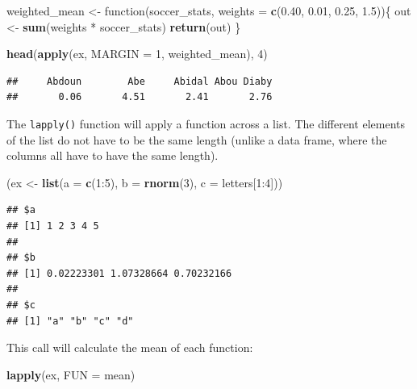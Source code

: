 \documentclass[]{book}
\makeatletter
\newenvironment{Shaded}{\begin{snugshade}}{\end{snugshade}}
\newcommand{\KeywordTok}[1]{\textcolor[rgb]{0.13,0.29,0.53}{\textbf{{#1}}}}
\newcommand{\DataTypeTok}[1]{\textcolor[rgb]{0.13,0.29,0.53}{{#1}}}
\newcommand{\DecValTok}[1]{\textcolor[rgb]{0.00,0.00,0.81}{{#1}}}
\newcommand{\FloatTok}[1]{\textcolor[rgb]{0.00,0.00,0.81}{{#1}}}
\newcommand{\StringTok}[1]{\textcolor[rgb]{0.31,0.60,0.02}{{#1}}}
\newcommand{\NormalTok}[1]{{#1}}
\newenvironment{kframe}{%
\medskip{}
\setlength{\fboxsep}{.8em}
 \def\at@end@of@kframe{}%
 \ifinner\ifhmode%
  \def\at@end@of@kframe{\end{minipage}}%
  \begin{minipage}{\columnwidth}%
 \fi\fi%
 \def\FrameCommand##1{\hskip\@totalleftmargin \hskip-\fboxsep
 \colorbox{shadecolor}{##1}\hskip-\fboxsep
     \hskip-\linewidth \hskip-\@totalleftmargin \hskip\columnwidth}%
 \MakeFramed {\advance\hsize-\width
   \@totalleftmargin\z@ \linewidth\hsize
   \@setminipage}}%
 {\par\unskip\endMakeFramed%
 \at@end@of@kframe}
\renewenvironment{Shaded}{\begin{kframe}}{\end{kframe}}
\makeatother
\begin{document}
\begin{Shaded}
\begin{Highlighting}[]
\NormalTok{weighted_mean <-}\StringTok{ }\NormalTok{function(soccer_stats,}
                          \DataTypeTok{weights =} \KeywordTok{c}\NormalTok{(}\FloatTok{0.40}\NormalTok{, }\FloatTok{0.01}\NormalTok{,}
                                      \FloatTok{0.25}\NormalTok{, }\FloatTok{1.5}\NormalTok{))\{}
  \NormalTok{out <-}\StringTok{ }\KeywordTok{sum}\NormalTok{(weights *}\StringTok{ }\NormalTok{soccer_stats)}
  \KeywordTok{return}\NormalTok{(out)}
\NormalTok{\}}

\KeywordTok{head}\NormalTok{(}\KeywordTok{apply}\NormalTok{(ex, }\DataTypeTok{MARGIN =} \DecValTok{1}\NormalTok{, weighted_mean), }\DecValTok{4}\NormalTok{)}
\end{Highlighting}
\end{Shaded}

\begin{verbatim}
##     Abdoun        Abe     Abidal Abou Diaby 
##       0.06       4.51       2.41       2.76
\end{verbatim}

The \texttt{lapply()} function will apply a function across a list. The
different elements of the list do not have to be the same length (unlike
a data frame, where the columns all have to have the same length).

\begin{Shaded}
\begin{Highlighting}[]
\NormalTok{(ex <-}\StringTok{ }\KeywordTok{list}\NormalTok{(}\DataTypeTok{a =} \KeywordTok{c}\NormalTok{(}\DecValTok{1}\NormalTok{:}\DecValTok{5}\NormalTok{), }\DataTypeTok{b =} \KeywordTok{rnorm}\NormalTok{(}\DecValTok{3}\NormalTok{), }\DataTypeTok{c =} \NormalTok{letters[}\DecValTok{1}\NormalTok{:}\DecValTok{4}\NormalTok{]))}
\end{Highlighting}
\end{Shaded}

\begin{verbatim}
## $a
## [1] 1 2 3 4 5
## 
## $b
## [1] 0.02223301 1.07328664 0.70232166
## 
## $c
## [1] "a" "b" "c" "d"
\end{verbatim}

This call will calculate the mean of each function:

\begin{Shaded}
\begin{Highlighting}[]
\KeywordTok{lapply}\NormalTok{(ex, }\DataTypeTok{FUN =} \NormalTok{mean)}
\end{Highlighting}
\end{Shaded}
\end{document}
